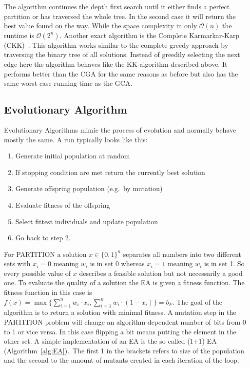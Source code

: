 The algorithm continues the depth first search until it either finds a perfect partition or has traversed the whole tree.
In the second case it will return the best value found on the way.
While the space complexity in only $\mathcal{O}(n)$ the runtime is $\mathcal{O}(2^n)$.
Another exact algorithm is the Complete Karmarkar-Karp (CKK)~\cite{korf1998complete}.
This algorithm works similar to the complete greedy approach by traversing the binary tree of all solutions.
Instead of greedily selecting the next edge here the algorithm behaves like the KK-algorithm described above.
It performs better than the CGA for the same reasons as before but also has the same worst case running time as the GCA.

\subsection{Evolutionary Algorithm}
Evolutionary Algorithms mimic the process of evolution and normally behave mostly the same.
A run typically looks like this:
\begin{enumerate}
      \item Generate initial population at random
      \item If stopping condition are met return the currently best solution
      \item Generate offspring population (e.g.\ by mutation)
      \item Evaluate fitness of the offspring
      \item Select fittest individuals and update population
      \item Go back to step 2.
\end{enumerate}
For PARTITION a solution $x\in{\{0,1\}}^{n}$ separates all numbers into two different sets with $x_i=0$ meaning $w_i$ is in set 0 whereas $x_i=1$ meaning $w_i$ is in set 1.
So every possible value of $x$ describes a feasible solution but not necessarily a good one.
To evaluate the quality of a solution the EA is given a fitness function.
The fitness function in this case is \(f(x)=\max\{\sum_{i=1}^{n}w_i\cdot x_i, \sum_{i=1}^{n}w_i\cdot(1-x_i)\}=b_F\).
The goal of the algorithm is to return a solution with minimal fitness.
A mutation step in the PARTITION problem will change an algorithm-dependent number of bits from 0 to 1 or vice versa.
In this case flipping a bit means putting the element in the other set.
A simple implementation of an EA is the so called (1+1) EA (Algorithm~\ref{alg:EA}).\
The first 1 in the brackets refers to size of the population and the second to the amount of mutants created in each iteration of the loop.
